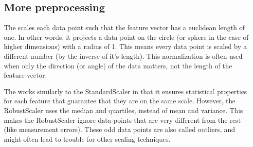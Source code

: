 \documentclass[letterpaper,10pt,english]{sphinxmanual}
\begin{document}
\subsection{More preprocessing}
\label{\detokenize{chapter8:more-preprocessing}}
The  scales each data
point such that the feature vector has a euclidean length of one. In other words, it
projects a data point on the circle (or sphere in the case of higher dimensions) with a
radius of 1. This means every data point is scaled by a different number (by the
inverse of it’s length).
This normalization is often used when only the direction (or angle) of the data matters,
not the length of the feature vector.

The  works similarly to the StandardScaler in that it
ensures statistical properties for each feature that guarantee that
they are on the same scale. However, the RobustScaler uses the median
and quartiles, instead of mean and variance. This makes the
RobustScaler ignore data points that are very different from the rest
(like measurement errors). These odd data points are also called
outliers, and might often lead to trouble for other scaling
techniques.
\end{document}
